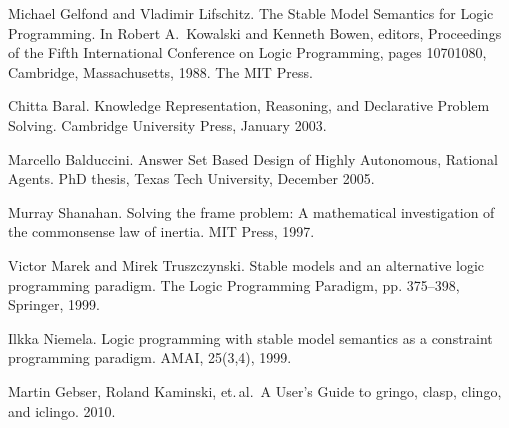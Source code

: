 \documentclass{article}
\begin{document}
\begin{thebibliography}{2}

Michael Gelfond and Vladimir Lifschitz.
The Stable Model Semantics for Logic Programming.
In Robert A.\, Kowalski and Kenneth Bowen, editors, Proceedings of the Fifth International Conference on Logic Programming, pages 1070{1080}, Cambridge, Massachusetts, 1988.
The MIT Press.

Chitta Baral.
Knowledge Representation, Reasoning, and Declarative Problem Solving.
Cambridge University Press, January 2003.

Marcello Balduccini.
Answer Set Based Design of Highly Autonomous, Rational Agents.
PhD thesis, Texas Tech University, December 2005.

Murray Shanahan.
Solving the frame problem: A mathematical investigation of the commonsense law of inertia.
MIT Press, 1997.

Victor Marek and Mirek Truszczynski.
Stable models and an alternative logic programming paradigm.
The Logic Programming Paradigm, pp. 375–398, Springer, 1999.

Ilkka Niemela.
Logic programming with stable model semantics as a constraint programming paradigm.
AMAI, 25(3,4), 1999.

Martin Gebser, Roland Kaminski, et.\,al.\,
A User's Guide to gringo, clasp, clingo, and iclingo.
2010.

\end{thebibliography}
\end{document}
